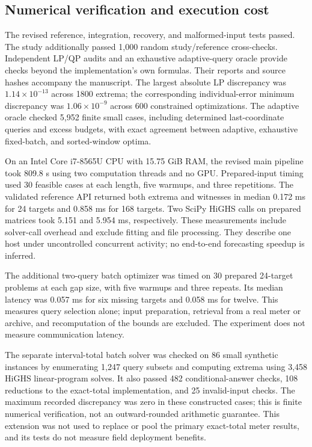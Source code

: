 \documentclass[12pt]{article}
\begin{document}
\FloatBarrier
\subsection{Numerical verification and execution cost}
The revised reference, integration, recovery, and malformed-input tests
passed. The study additionally passed 1,000
random study/reference cross-checks. Independent LP/QP audits and an
exhaustive adaptive-query oracle provide checks beyond the implementation's
own formulas. Their reports and source hashes accompany the manuscript.
The largest absolute LP discrepancy was $1.14\times10^{-13}$
across 1800 extrema; the corresponding
individual-error minimum discrepancy was $1.06\times10^{-9}$
across 600 constrained optimizations.
The adaptive oracle checked 5,952 finite small cases, including determined
last-coordinate queries and excess budgets, with exact agreement between
adaptive, exhaustive fixed-batch, and sorted-window optima.

On an Intel Core i7-8565U CPU with 15.75 GiB RAM, the revised main
pipeline took 809.8 s using two computation
threads and no GPU. Prepared-input timing used 30 feasible cases at each
length, five warmups, and three repetitions. The validated reference API
returned both extrema and witnesses in median 0.172 ms for
24 targets and 0.858 ms for 168 targets.
Two SciPy HiGHS calls on prepared matrices took
5.151 and
5.954 ms, respectively.
These measurements include solver-call overhead and exclude fitting and
file processing. They describe one host under uncontrolled concurrent
activity; no end-to-end forecasting speedup is inferred.

The additional two-query batch optimizer was timed on 30 prepared
24-target problems at each gap size, with five warmups and three repeats.
Its median latency was 0.057 ms for
six missing targets and 0.058 ms for
twelve. This measures query selection alone; input preparation, retrieval
from a real meter or archive, and recomputation of the bounds are excluded.
The experiment does not measure communication latency.

The separate interval-total batch solver was checked on 86
small synthetic instances by enumerating 1,247
query subsets and computing extrema using 3,458
HiGHS linear-program solves. It also passed 482
conditional-answer checks, 108
reductions to the exact-total implementation, and 25
invalid-input checks. The maximum recorded discrepancy was zero in these
constructed cases; this is finite numerical verification, not an
outward-rounded arithmetic guarantee. This extension was not used to
replace or pool the primary exact-total meter results, and its tests do
not measure field deployment benefits.
\FloatBarrier
\end{document}

